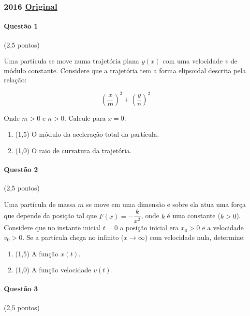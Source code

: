 \documentclass[12pt,a4paper]{article}
\newcommand{\original}[1]{\tiny \href{#1}{Original} \normalsize}
\begin{document}
\newpage

\subsubsection{2016 \original{https://drive.google.com/file/d/1CWmNZs__Zg8e2EggOGfoaTazIz2uXSIU/view?usp=sharing}}

\paragraph{Questão 1} (2,5 pontos)

Uma partícula se move numa trajetória plana $y(x)$ com uma velocidade $v$ de módulo constante. Considere que a trajetória tem a forma elipsoidal descrita pela relação:

$$\left(\frac x m\right)^2+\left(\frac y n\right)^2$$

Onde $m>0$ e $n>0$. Calcule para $x=0$:

\begin{enumerate}[label=(\alph*)]

\item (1,5) O módulo da aceleração total da partícula.

\item (1,0) O raio de curvatura da trajetória.

\end{enumerate}

\paragraph{Questão 2} (2,5 pontos)

Uma partícula de massa $m$ se move em uma dimensão e sobre ela atua uma força que depende da posição tal que $F(x)=-\dfrac{k}{x^2}$, onde $k$ é uma constante ($k>0$). Considere que no instante inicial $t=0$ a posição inicial era $x_0>0$ e a velocidade $v_0>0$. Se a partícula chega no infinito ($x\to \infty$) com velocidade nula, determine:

\begin{enumerate}[label=(\alph*)]

\item (1,5) A função $x(t)$.

\item (1,0) A função velocidade $v(t)$.

\end{enumerate}

\paragraph{Questão 3} (2,5 pontos)
\end{document}
